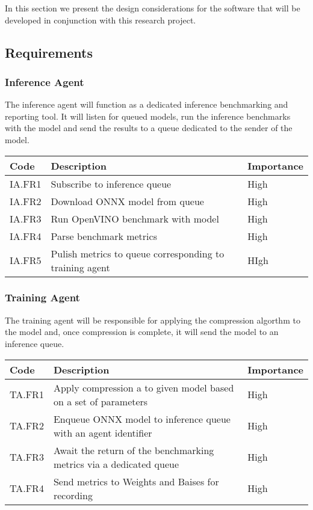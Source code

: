 \documentclass[../../D1.tex]{subfiles}
\begin{document}
In this section we present the design considerations for the software that will be developed in conjunction with this research project.

\subsection{Requirements}
\subsubsection{Inference Agent}
The inference agent will function as a dedicated inference benchmarking and reporting tool. It will listen for queued models, run the inference benchmarks with the model and send the results to a queue dedicated to the sender of the model.

\begin{table}[h]
    \begin{tabular}{@{}l|p{10cm}|l@{}}
    \toprule
    Code   & Description                                             & Importance \\ \midrule
    IA.FR1 & Subscribe to inference queue                            & High       \\
    IA.FR2 & Download ONNX model from queue                          & High       \\
    IA.FR3 & Run OpenVINO benchmark with model                       & High       \\
    IA.FR4 & Parse benchmark metrics                                 & High       \\
    IA.FR5 & Pulish metrics to queue corresponding to training agent & HIgh       \\ \bottomrule
    \end{tabular}
\end{table}

\subsubsection{Training Agent}
The training agent will be responsible for applying the compression algorthm to the model and, once compression is complete, it will send the model to an inference queue.
\begin{table}[h]
    \begin{tabular}{@{}l|p{10cm}|l@{}}
    \toprule
    Code   & Description                                                        & Importance \\ \midrule
    TA.FR1 & Apply compression a to given model based on a set of parameters    & High       \\
    TA.FR2 & Enqueue ONNX model to inference queue with an agent identifier     & High       \\
    TA.FR3 & Await the return of the benchmarking metrics via a dedicated queue & High       \\
    TA.FR4 & Send metrics to Weights and Baises for recording                   & High       \\ \bottomrule
    \end{tabular}
    \end{table}
\end{document}
